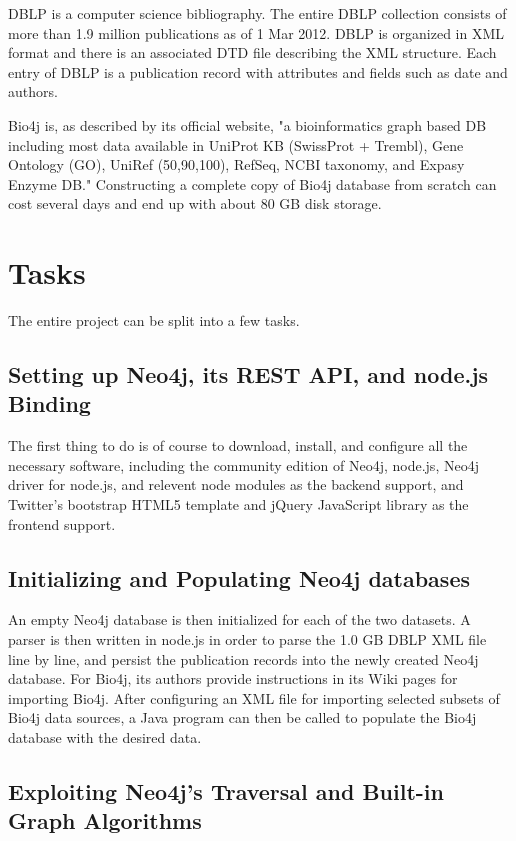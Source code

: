 \documentclass[10pt, conference, compsocconf]{../IEEEtran}
\begin{document}
DBLP is a computer science bibliography. The entire DBLP collection consists of more than 1.9 million publications as of 1 Mar 2012. DBLP is organized in XML format and there is an associated DTD file describing the XML structure. Each entry of DBLP is a publication record with attributes and fields such as date and authors.

Bio4j is, as described by its official website, "a bioinformatics graph based DB including most data available in UniProt KB (SwissProt + Trembl), Gene Ontology (GO), UniRef (50,90,100), RefSeq, NCBI taxonomy, and Expasy Enzyme DB." Constructing a complete copy of Bio4j database from scratch can cost several days and end up with about 80 GB disk storage.

\section{Tasks}

The entire project can be split into a few tasks.

\subsection{Setting up Neo4j, its REST API, and node.js Binding}

The first thing to do is of course to download, install, and configure all the necessary software, including the community edition of Neo4j, node.js, Neo4j driver for node.js, and relevent node modules as the backend support, and Twitter's bootstrap HTML5 template and jQuery JavaScript library as the frontend support.

\subsection{Initializing and Populating Neo4j databases}

An empty Neo4j database is then initialized for each of the two datasets. A parser is then written in node.js in order to parse the 1.0 GB DBLP XML file line by line, and persist the publication records into the newly created Neo4j database. For Bio4j, its authors provide instructions in its Wiki pages for importing Bio4j. After configuring an XML file for importing selected subsets of Bio4j data sources, a Java program can then be called to populate the Bio4j database with the desired data.

\subsection{Exploiting Neo4j's Traversal and Built-in Graph Algorithms}
\end{document}
